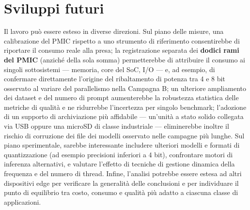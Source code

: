 \section{Sviluppi futuri}

Il lavoro può essere esteso in diverse direzioni. Sul piano delle misure, una
calibrazione del PMIC rispetto a uno strumento di riferimento consentirebbe di
riportare il consumo reale alla presa; la registrazione separata dei \textbf{dodici
rami del PMIC} (anziché della sola somma) permetterebbe di attribuire il consumo ai
singoli sottosistemi --- memoria, core del SoC, I/O --- e, ad esempio, di confermare
direttamente l'origine del ribaltamento di potenza tra 4 e 8 bit osservato al variare
del parallelismo nella Campagna B; un ulteriore ampliamento dei dataset e del
numero di prompt aumenterebbe la robustezza statistica delle metriche di qualità e ne
ridurrebbe l'incertezza per singolo benchmark; l'adozione di un supporto di archiviazione più affidabile --- un'unità a
stato solido collegata via USB oppure una microSD di classe industriale --- eliminerebbe
inoltre il rischio di corruzione dei file dei modelli osservato nelle campagne più
lunghe. Sul piano
sperimentale, sarebbe interessante includere ulteriori modelli e formati di
quantizzazione (ad esempio precisioni inferiori a 4 bit), confrontare motori di
inferenza alternativi, e valutare l'effetto di tecniche di gestione dinamica
della frequenza e del numero di thread. Infine, l'analisi potrebbe essere estesa
ad altri dispositivi edge per verificare la generalità delle conclusioni e per
individuare il punto di equilibrio tra costo, consumo e qualità più adatto a
ciascuna classe di applicazioni.
